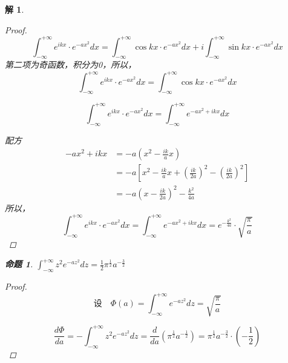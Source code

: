 \documentclass[12pt,a4paper]{article}
\newtheorem*{solution}{解}
\newtheorem{example}{命题}
\begin{document}
\begin{solution}
		\begin{proof}
	
\begin{equation*}
		\int_{-\infty}^{+\infty} e^{ikx} \cdot e^{-a x^2} dx =\int_{-\infty}^{+\infty} \cos kx \cdot e^{-a x^2} dx+i\int_{-\infty}^{+\infty} \sin kx \cdot e^{-a x^2} dx
\end{equation*}
第二项为奇函数，积分为0，所以，
\begin{equation*}
\int_{-\infty}^{+\infty} e^{ikx} \cdot e^{-a x^2} dx =\int_{-\infty}^{+\infty} \cos kx \cdot e^{-a x^2} dx
\end{equation*}

\begin{equation*}
	\int_{-\infty}^{+\infty} e^{ikx} \cdot e^{-a x^2} dx = \int_{-\infty}^{+\infty} e^{-a x^2 + ikx} dx
\end{equation*}

配方
\begin{equation*}
	\begin{split}
		-a x^2 + ikx &= -a \left( x^2 - \frac{ik}{a} x \right) \\
		&= -a \left[ x^2 - \frac{ik}{a} x + \left( \frac{ik}{2a} \right)^2 - \left( \frac{ik}{2a} \right)^2 \right] \\
		&= -a \left( x - \frac{ik}{2a} \right)^2 - \frac{k^2}{4a}
	\end{split}
\end{equation*}
所以，
	\begin{equation*}
		\int_{-\infty}^{+\infty} e^{ikx} \cdot e^{-a x^2} dx = \int_{-\infty}^{+\infty} e^{-a x^2 + ikx} dx	= e^{-\frac{k^2}{4a}} \cdot \sqrt{\frac{\pi}{a}}
	\end{equation*}
		\end{proof}
	
	
		\begin{example}\label{ex:4}
$\int_{-\infty}^{+\infty} z^2 e^{-a z^2} dz = \frac{1}{2} \pi^{\frac{1}{2}} a^{-\frac{3}{2}}$
	\end{example}
	
	\begin{proof}
		
	
	\begin{equation*}
		\text{设} \quad \Phi(a) = \int_{-\infty}^{+\infty} e^{-a z^2} dz = \sqrt{\frac{\pi}{a}}
	\end{equation*}
	
	\begin{equation*}
		\frac{d\Phi}{da} = -\int_{-\infty}^{+\infty} z^2 e^{-a z^2} dz = \frac{d}{da} \left( \pi^{\frac{1}{2}} a^{-\frac{1}{2}} \right) = \pi^{\frac{1}{2}} a^{-\frac{3}{2}} \cdot \left( -\frac{1}{2} \right)
	\end{equation*}
	

\end{proof}
\end{solution}
\end{document}
